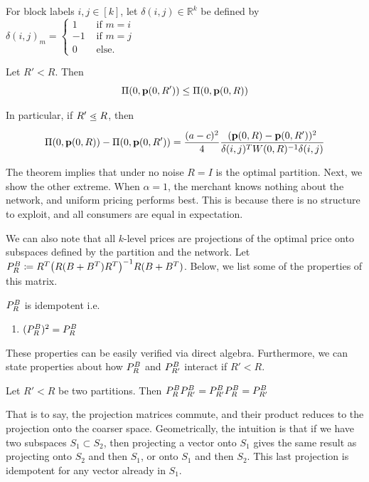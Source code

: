 For block labels $i, j \in [k]$, let $\delta(i,j) \in \mathbb{R}^k$ be defined by ${\delta(i,j)}_m = \begin{cases} 1 & \text{ if } m=i \\
-1 & \text{ if } m=j \\
0 & \text{ else. }
\end{cases}$
\begin{theorem}
    Let $R' < R$. Then
    \[ \Pi( 0, \mathbf{p}(0, R')) \leq \Pi(0, \mathbf{p}(0,R))\]

    In particular, if $R' \leatom R$, then 
    \[ \Pi(0, \mathbf{p}(0,R)) -  \Pi(0, \mathbf{p}(0, R')) = \frac{(a-c)^2}{4} \frac{ (\mathbf{p}(0,R) - \mathbf{p}(0, R'))^2 }{\delta(i,j)^T W(0,R)^{-1}  \delta(i,j)} \] 

\end{theorem}

The theorem implies that under no noise $R=I$ is the optimal partition. Next, we show the other extreme. When $\alpha = 1$, the merchant knows nothing about the network, and uniform pricing performs best. This is because there is no structure to exploit, and all consumers are equal in expectation.

We can also note that all $k$-level prices are projections of the optimal price onto subspaces defined by the partition and the network. Let $P_{R}^{B} \coloneqq R^T {\left( R (B+B^T)R^T \right)}^{-1} R (B+B^T)$. Below, we list some of the properties of this matrix.
\begin{proposition}
    $P_{R}^{B}$ is idempotent i.e. 
    \begin{enumerate}
        \item $(P_{R}^{B})^2 = P_{R}^{B}  $
    \end{enumerate}
\end{proposition}
These properties can be easily verified via direct algebra. Furthermore, we can state properties about how $P_{R}^{B}$ and $P_{R'}^{B}$ interact if $R' < R$.
\begin{proposition}
    Let $R' < R$ be two partitions. Then $P_{R}^{B} P_{R'}^{B} = P_{R'}^{B} P_{R}^{B} = P_{R'}^{B} $
\end{proposition}

That is to say, the projection matrices commute, and their product reduces to the projection onto the coarser space. Geometrically, the intuition is that if we have two subspaces $S_1 \subset S_2$, then projecting a vector onto $S_1$ gives the same result as projecting onto $S_2$ and then $S_1$, or onto $S_1$ and then $S_2$. This last projection is idempotent for any vector already in $S_1$. 

